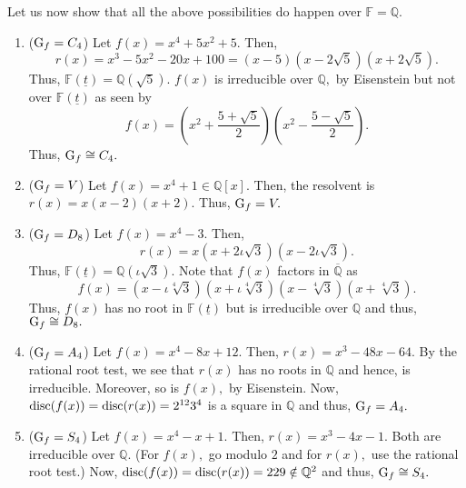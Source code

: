\begin{ex}
	Let us now show that all the above possibilities do happen over $\mathbb{F} = \mathbb{Q}.$
	\begin{enumerate}
		\item ($\operatorname{G}_f = C_4$) Let $f(x) = x^4 + 5x^2 + 5.$ Then,
		\begin{equation*} 
			r(x) = x^3 - 5x^2 - 20x + 100 = (x - 5)(x - 2\sqrt{5})(x + 2\sqrt{5}).
		\end{equation*}
		Thus, $\mathbb{F}(\underline{t}) = \mathbb{Q}(\sqrt{5}).$ $f(x)$ is irreducible over $\mathbb{Q},$ by Eisenstein but not over $\mathbb{F}(\underline{t})$ as seen by
		\begin{equation*} 
			f(x) = \left(x^2 + \frac{5 + \sqrt{5}}{2}\right)\left(x^2 - \frac{5 - \sqrt{5}}{2}\right).
		\end{equation*}
		Thus, $\operatorname{G}_f \cong C_4.$
		\item ($\operatorname{G}_f = V$) Let $f(x) = x^4 + 1 \in \mathbb{Q}[x].$ Then, the resolvent is $r(x) = x(x - 2)(x + 2).$ Thus, $\operatorname{G}_f = V.$
		\item ($\operatorname{G}_f = D_8$) Let $f(x) = x^4 - 3.$ Then,
		\begin{equation*} 
			r(x) = x(x + 2\iota\sqrt{3})(x - 2\iota\sqrt{3}).
		\end{equation*}
		Thus, $\mathbb{F}(\underline{t}) = \mathbb{Q}(\iota\sqrt{3}).$ Note that $f(x)$ factors in $\overline{\mathbb{Q}}$ as
		\begin{equation*} 
			f(x) = (x - \iota\sqrt[4]{3})(x + \iota\sqrt[4]{3})(x - \sqrt[4]{3})(x + \sqrt[4]{3}).
		\end{equation*}
		Thus, $f(x)$ has no root in $\mathbb{F}(\underline{t})$ but is irreducible over $\mathbb{Q}$ and thus, $\operatorname{G}_f \cong D_8.$
		\item ($\operatorname{G}_f = A_4$) Let $f(x) = x^4 - 8x + 12.$ Then, $r(x) = x^3 - 48x - 64.$ By the rational root test, we see that $r(x)$ has no roots in $\mathbb{Q}$ and hence, is irreducible. Moreover, so is $f(x),$ by Eisenstein. Now, $\operatorname{disc}(f(x)) = \operatorname{disc}(r(x)) = 2^{12}3^4$ is a square in $\mathbb{Q}$ and thus, $\operatorname{G}_f = A_4.$
		\item ($\operatorname{G}_f = S_4$) Let $f(x) = x^4 - x + 1.$ Then, $r(x) = x^3 - 4x - 1.$ Both are irreducible over $\mathbb{Q}.$ (For $f(x),$ go modulo $2$ and for $r(x),$ use the rational root test.) Now, $\operatorname{disc}(f(x)) = \operatorname{disc}(r(x)) = 229 \notin \mathbb{Q}^2$ and thus, $\operatorname{G}_f \cong S_4.$
	\end{enumerate}
\end{ex}